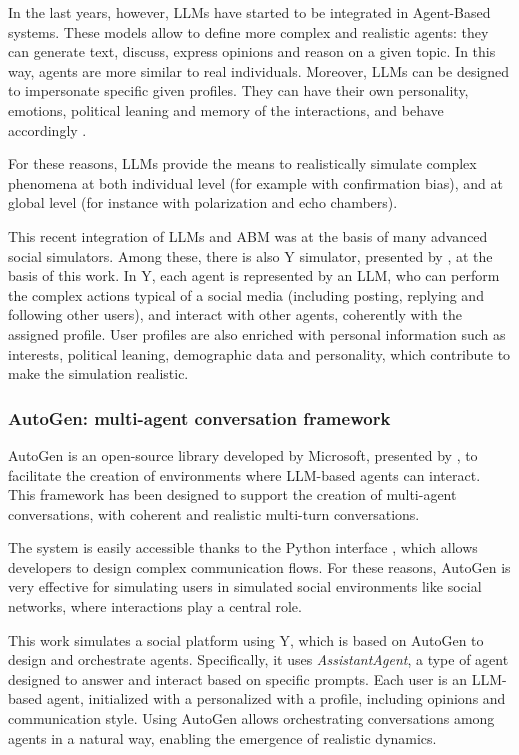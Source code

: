 \medskip
In the last years, however, LLMs have started to be integrated in Agent-Based systems.
These models allow to define more complex and realistic agents: they can generate text, discuss, express opinions and reason on a given topic. 
In this way, agents are more similar to real individuals.
Moreover, LLMs can be designed to impersonate specific given profiles. They can have their own personality, emotions, political leaning and memory of the interactions, and behave accordingly \cite{rossetti2024ysocialllmpoweredsocial}.

For these reasons, LLMs provide the means to realistically simulate complex phenomena at both individual level (for example with confirmation bias), and at global level (for instance with polarization and echo chambers).

\medskip
This recent integration of LLMs and ABM was at the basis of many advanced social simulators.
Among these, there is also Y simulator, presented by \citet{rossetti2024ysocialllmpoweredsocial}, at the basis of this work.
In Y, each agent is represented by an LLM, who can perform the complex actions typical of a social media (including posting, replying and following other users), and interact with other agents, coherently with the assigned profile.
User profiles are also enriched with personal information such as interests, political leaning, demographic data and personality, which contribute to make the simulation realistic.


\subsubsection{AutoGen: multi-agent conversation framework}
AutoGen is an open-source library developed by Microsoft, presented by \citet{wu2023autogenenablingnextgenllm}, to facilitate the creation of environments where LLM-based agents can interact.
This framework has been designed to support the creation of multi-agent conversations, with coherent and realistic multi-turn conversations. 

\medskip
The system is easily accessible thanks to the Python interface \cite{pyautogen0.2.31}, which allows developers to design complex communication flows.
For these reasons, AutoGen is very effective for simulating users in simulated social environments like social networks, where interactions play a central role.

\medskip
This work simulates a social platform using Y\cite{rossetti2024ysocialllmpoweredsocial}, which is based on AutoGen to design and orchestrate agents.
Specifically, it uses \textit{AssistantAgent}, a type of agent designed to answer and interact based on specific prompts.
Each user is an LLM-based agent, initialized with a personalized with a profile, including opinions and communication style.
Using AutoGen allows orchestrating conversations among agents in a natural way, enabling the emergence of realistic dynamics.


